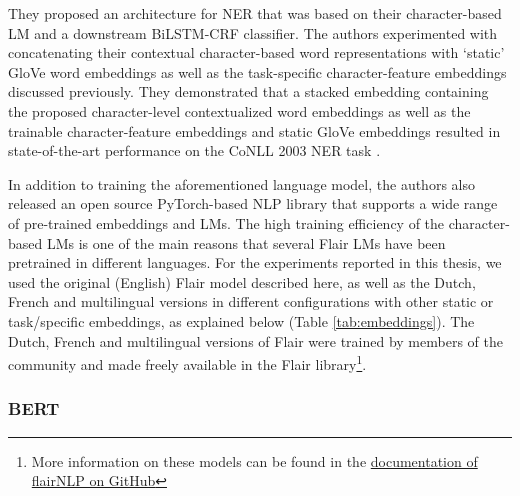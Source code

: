 \documentclass[12pt,a4paper,]{book}
\begin{document}
They proposed an architecture for NER that was based on their character-based LM and a downstream BiLSTM-CRF classifier. The authors experimented with concatenating their contextual character-based word representations with `static' GloVe word embeddings as well as the task-specific character-feature embeddings discussed previously. They demonstrated that a stacked embedding containing the proposed character-level contextualized word embeddings as well as the trainable character-feature embeddings and static GloVe embeddings resulted in state-of-the-art performance on the CoNLL 2003 NER task \citep{akbik2018}.

In addition to training the aforementioned language model, the authors also released an open source PyTorch-based NLP library \citep{akbik2019b} that supports a wide range of pre-trained embeddings and LMs. The high training efficiency of the character-based LMs is one of the main reasons that several Flair LMs have been pretrained in different languages. For the experiments reported in this thesis, we used the original (English) Flair model described here, as well as the Dutch, French and multilingual versions in different configurations with other static or task/specific embeddings, as explained below (Table \ref{tab:embeddings}). The Dutch, French and multilingual versions of Flair were trained by members of the community and made freely available in the Flair library\footnote{More information on these models can be found in the \href{https://github.com/flairNLP/flair/blob/083eb114505ede0ea3070317a5a08d13fc71891b/resources/docs/embeddings/FLAIR_EMBEDDINGS.md}{documentation of flairNLP on GitHub}}.

\hypertarget{bert}{%
\subsubsection{BERT}\label{bert}}
\end{document}
